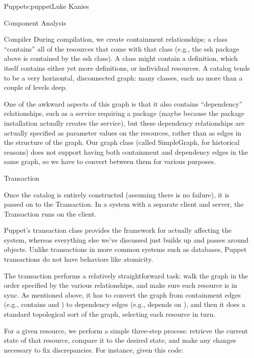 \begin{aosachapter}{Puppet}{s:puppet}{Luke Kanies}
\begin{aosasect1}{Component Analysis}
\begin{aosasect2}{Compiler}
During compilation, we create containment relationships; a class
``contains'' all of the resources that come with that class (e.g., the
ssh package above is contained by the ssh class).  A class
might contain a definition, which itself contains either yet more
definitions, or individual resources.  A catalog tends to be a very
horizontal, disconnected graph: many classes, each no more than a
couple of levels deep.

One of the awkward aspects of this graph is that it also contains
``dependency'' relationships, such as a service requiring a package
(maybe because the package installation actually creates the service),
but these dependency relationships are actually specified as parameter
values on the resources, rather than as edges in the structure of the
graph.  Our graph class (called SimpleGraph, for historical reasons)
does not support having both containment and dependency edges in the
same graph, so we have to convert between them for various purposes.

\end{aosasect2}

\begin{aosasect2}{Transaction}

Once the catalog is entirely constructed (assuming there is no
failure), it is passed on to the Transaction.  In a system with a
separate client and server, the Transaction runs on the client.

Puppet's transaction class provides the framework for actually
affecting the system, whereas everything else we've discussed just
builds up and passes around objects.  Unlike transactions in more
common systems such as databases, Puppet transactions do not have
behaviors like atomicity.

The transaction performs a relatively straightforward task: walk the
graph in the order specified by the various relationships, and make
sure each resource is in sync.  As mentioned above, it has to convert
the graph from containment edges (e.g.,  contains
 and ) to dependency edges (e.g.,
 depends on ), and then it does a standard
topological sort of the graph, selecting each resource in turn.

For a given resource, we perform a simple three-step process: retrieve
the current state of that resource, compare it to the desired state,
and make any changes necessary to fix discrepancies.  For
instance, given this code:


\end{aosasect2}
\end{aosasect1}
\end{aosachapter}
